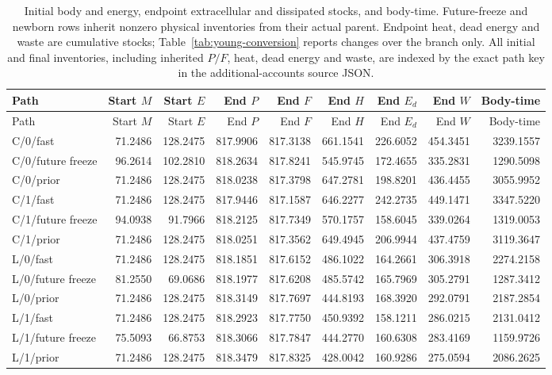 \begin{longtable}{lrrrrrrrr}
\caption{Initial body and energy, endpoint extracellular and dissipated stocks, and body-time. Future-freeze and newborn rows inherit nonzero physical inventories from their actual parent. Endpoint heat, dead energy and waste are cumulative stocks; Table~\ref{tab:young-conversion} reports changes over the branch only. All initial and final inventories, including inherited $P/F$, heat, dead energy and waste, are indexed by the exact path key in the additional-accounts source JSON.}\label{tab:young-inventories}\\
\toprule
Path & Start $M$ & Start $E$ & End $P$ & End $F$ & End $H$ & End $E_d$ & End $W$ & Body-time \\
\midrule\endfirsthead
\toprule
Path & Start $M$ & Start $E$ & End $P$ & End $F$ & End $H$ & End $E_d$ & End $W$ & Body-time \\
\midrule\endhead
C/0/fast & 71.2486 & 128.2475 & 817.9906 & 817.3138 & 661.1541 & 226.6052 & 454.3451 & 3239.1557 \\
C/0/future freeze & 96.2614 & 102.2810 & 818.2634 & 817.8241 & 545.9745 & 172.4655 & 335.2831 & 1290.5098 \\
C/0/prior & 71.2486 & 128.2475 & 818.0238 & 817.3798 & 647.2781 & 198.8201 & 436.4455 & 3055.9952 \\
C/1/fast & 71.2486 & 128.2475 & 817.9446 & 817.1587 & 646.2277 & 242.2735 & 449.1471 & 3347.5220 \\
C/1/future freeze & 94.0938 & 91.7966 & 818.2125 & 817.7349 & 570.1757 & 158.6045 & 339.0264 & 1319.0053 \\
C/1/prior & 71.2486 & 128.2475 & 818.0251 & 817.3562 & 649.4945 & 206.9944 & 437.4759 & 3119.3647 \\
L/0/fast & 71.2486 & 128.2475 & 818.1851 & 817.6152 & 486.1022 & 164.2661 & 306.3918 & 2274.2158 \\
L/0/future freeze & 81.2550 & 69.0686 & 818.1977 & 817.6208 & 485.5742 & 165.7969 & 305.2791 & 1287.3412 \\
L/0/prior & 71.2486 & 128.2475 & 818.3149 & 817.7697 & 444.8193 & 168.3920 & 292.0791 & 2187.2854 \\
L/1/fast & 71.2486 & 128.2475 & 818.2923 & 817.7750 & 450.9392 & 158.1211 & 286.0215 & 2131.0412 \\
L/1/future freeze & 75.5093 & 66.8753 & 818.3066 & 817.7847 & 444.2770 & 160.6308 & 283.4169 & 1159.9726 \\
L/1/prior & 71.2486 & 128.2475 & 818.3479 & 817.8325 & 428.0042 & 160.9286 & 275.0594 & 2086.2625 \\

\end{longtable}
